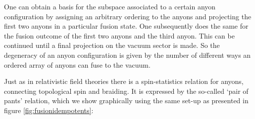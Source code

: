 \documentclass[12 pt]{article}
\begin{document}
One can obtain a basis for the subspace associated to a certain anyon configuration by assigning an arbitrary ordering to the anyons and projecting the first two anyons in a particular fusion state. One subsequently does the same for the fusion outcome of the first two anyons and the third anyon. This can be continued until a final projection on the vacuum sector is made. So the degeneracy of an anyon configuration is given by the number of different ways an ordered array of anyons can fuse to the vacuum.

Just as in relativistic field theories there is a spin-statistics relation for anyons, connecting topological spin and braiding. It is expressed by the so-called `pair of pants' relation, which we show graphically using the same set-up as presented in figure \ref{fig:fusionidempotents}:
\end{document}
